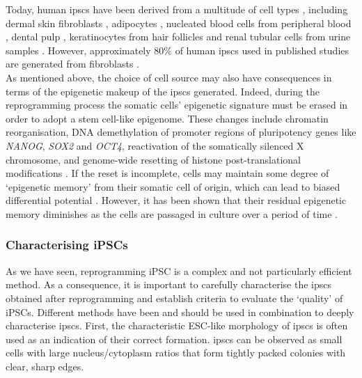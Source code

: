 Today, human \glspl{ipsc} have been derived from a multitude of cell types \cite{doss2019current}, including dermal skin fibroblasts \cite{takahashi2007induction, yu2007induced}, adipocytes \cite{sugii2010human}, nucleated blood cells from peripheral blood \cite{loh2009generation, seki2010generation}, dental pulp \cite{yan2010ips},
keratinocytes from hair follicles \cite{aasen2008efficient} and
renal tubular cells from urine samples \cite{cao2018generation}.
However, approximately 80\% of human \glspl{ipsc} used in published studies are generated from fibroblasts \cite{takahashi2016decade}. \\

As mentioned above, the choice of cell source may also have consequences in terms of the epigenetic makeup of the \glspl{ipsc} generated.
Indeed, during the reprogramming process the somatic cells' epigenetic signature must be erased in order to adopt a stem cell-like epigenome.
These changes include chromatin reorganisation, DNA demethylation of promoter regions of pluripotency genes like \textit{NANOG}, \textit{SOX2} and \textit{OCT4}, reactivation of the somatically silenced X chromosome, and genome-wide resetting of histone post-translational modifications \cite{takahashi2007induction, maherali2007directly, wernig2007vitro, buganim2013mechanisms}.
If the reset is incomplete, cells may maintain some degree of `epigenetic memory' from their somatic cell of origin, which can lead to biased differential potential \cite{kim2010epigenetic, polo2010cell}.
However, it has been shown that their residual epigenetic memory diminishes as the cells are passaged in culture over a period of time \cite{ghosh2010persistent}.

\subsubsection{Characterising iPSCs}
\label{sec:ipsc_characterise}

As we have seen, reprogramming iPSC is a complex and not particularly efficient method.
As a consequence, it is important to carefully characterise the \glspl{ipsc} obtained after reprogramming \cite{brouwer2016choices} and establish criteria to evaluate the `quality' of iPSCs.
Different methods have been and should be used in combination to deeply characterise \glspl{ipsc}. 
First, the characteristic ESC-like morphology of \glspl{ipsc} is often used as an indication of their correct formation. 
\glspl{ipsc} can be observed as small cells with large nucleus/cytoplasm ratios that form tightly packed colonies with clear, sharp edges. \\


